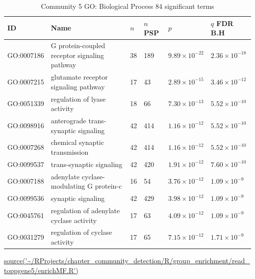 \begin{table}[ht]
\centering
\setlength{\extrarowheight}{2pt}
\begin{adjustbox}{width=\textwidth}
\begin{tabular}{llllll}
  \toprule
ID & Name &$n$ &$n$ PSP& $p$ & $q$ FDR B.H \\ 
  \midrule
GO:0007186 & G protein-coupled receptor signaling pathway & 38 & 189 & $9.89 \times 10^{-22}$ & $2.36 \times 10^{-18}$ \\ 
  GO:0007215 & glutamate receptor signaling pathway & 17 & 43 & $2.89 \times 10^{-15}$ & $3.46 \times 10^{-12}$ \\ 
  GO:0051339 & regulation of lyase activity & 18 & 66 & $7.30 \times 10^{-13}$ & $5.52 \times 10^{-10}$ \\ 
  GO:0098916 & anterograde trans-synaptic signaling & 42 & 414 & $1.16 \times 10^{-12}$ & $5.52 \times 10^{-10}$ \\ 
  GO:0007268 & chemical synaptic transmission & 42 & 414 & $1.16 \times 10^{-12}$ & $5.52 \times 10^{-10}$ \\ 
  GO:0099537 & trans-synaptic signaling & 42 & 420 & $1.91 \times 10^{-12}$ & $7.60 \times 10^{-10}$ \\ 
  GO:0007188 & adenylate cyclase-modulating G protein-c & 16 & 54 & $3.76 \times 10^{-12}$ & $1.09 \times 10^{-9}$ \\ 
  GO:0099536 & synaptic signaling & 42 & 429 & $3.98 \times 10^{-12}$ & $1.09 \times 10^{-9}$ \\ 
  GO:0045761 & regulation of adenylate cyclase activity & 17 & 63 & $4.09 \times 10^{-12}$ & $1.09 \times 10^{-9}$ \\ 
  GO:0031279 & regulation of cyclase activity & 17 & 65 & $7.15 \times 10^{-12}$ & $1.71 \times 10^{-9}$ \\ 
   \bottomrule
\end{tabular}
\end{adjustbox}
\caption[Community 5 Gene Ontology analysis Biological Process]{Community 5 GO: Biological Process 84 significant terms} 
\tiny\url{source('~/RProjects/chapter_community_detection/R/group_enrichment/read_toppgene5/enrichMF.R')}
\label{tab:Group 5 GO: Biological Process 84 significant terms}
\end{table}



